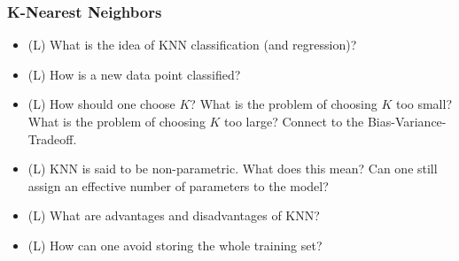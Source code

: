 \subsubsection*{K-Nearest Neighbors}
\begin{itemize}
    \item (L) What is the idea of KNN classification (and regression)?
    \answerboxM
    \item (L) How is a new data point classified?
    \answerboxM
    \item (L) How should one choose $K$? What is the problem of choosing $K$ too small? What is the problem of choosing $K$ too large? Connect to the Bias-Variance-Tradeoff.
    \answerboxM
    \item (L) KNN is said to be non-parametric. What does this mean? Can one still assign an effective number of parameters to the model?
    \answerboxM
    \item (L) What are advantages and disadvantages of KNN?
    \answerboxM
    \item (L) How can one avoid storing the whole training set?
    \answerboxM
\end{itemize}

